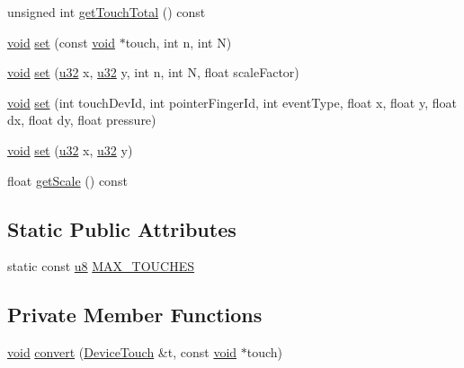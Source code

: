\begin{DoxyCompactItemize}
\item 
unsigned int \mbox{\hyperlink{classnjli_1_1_device_touch_a0e56cd03f8514af36b8d40151c913647}{get\+Touch\+Total}} () const
\item 
\mbox{\hyperlink{_thread_8h_af1e856da2e658414cb2456cb6f7ebc66}{void}} \mbox{\hyperlink{classnjli_1_1_device_touch_af37ae2aa3c4b1bb24a1f69e32a0cd659}{set}} (const \mbox{\hyperlink{_thread_8h_af1e856da2e658414cb2456cb6f7ebc66}{void}} $\ast$touch, int n, int N)
\item 
\mbox{\hyperlink{_thread_8h_af1e856da2e658414cb2456cb6f7ebc66}{void}} \mbox{\hyperlink{classnjli_1_1_device_touch_aab179cccc7d0c895455113d0706ae3b3}{set}} (\mbox{\hyperlink{_util_8h_a10e94b422ef0c20dcdec20d31a1f5049}{u32}} x, \mbox{\hyperlink{_util_8h_a10e94b422ef0c20dcdec20d31a1f5049}{u32}} y, int n, int N, float scale\+Factor)
\item 
\mbox{\hyperlink{_thread_8h_af1e856da2e658414cb2456cb6f7ebc66}{void}} \mbox{\hyperlink{classnjli_1_1_device_touch_a919bb88be34601d01c19c452bd3fae8b}{set}} (int touch\+Dev\+Id, int pointer\+Finger\+Id, int event\+Type, float x, float y, float dx, float dy, float pressure)
\item 
\mbox{\hyperlink{_thread_8h_af1e856da2e658414cb2456cb6f7ebc66}{void}} \mbox{\hyperlink{classnjli_1_1_device_touch_a82fca185d5e2b1378524b28db4fdd03e}{set}} (\mbox{\hyperlink{_util_8h_a10e94b422ef0c20dcdec20d31a1f5049}{u32}} x, \mbox{\hyperlink{_util_8h_a10e94b422ef0c20dcdec20d31a1f5049}{u32}} y)
\item 
float \mbox{\hyperlink{classnjli_1_1_device_touch_a9ae62b2e6e812acc5283a462788dbf81}{get\+Scale}} () const
\end{DoxyCompactItemize}
\subsection*{Static Public Attributes}
\begin{DoxyCompactItemize}
\item 
static const \mbox{\hyperlink{_util_8h_aed742c436da53c1080638ce6ef7d13de}{u8}} \mbox{\hyperlink{classnjli_1_1_device_touch_a8f2f389056e9750d3cee41875987c4fa}{M\+A\+X\+\_\+\+T\+O\+U\+C\+H\+ES}}
\end{DoxyCompactItemize}
\subsection*{Private Member Functions}
\begin{DoxyCompactItemize}
\item 
\mbox{\hyperlink{_thread_8h_af1e856da2e658414cb2456cb6f7ebc66}{void}} \mbox{\hyperlink{classnjli_1_1_device_touch_a2707fe5acb996fe22b1b20ceb6b1e063}{convert}} (\mbox{\hyperlink{classnjli_1_1_device_touch}{Device\+Touch}} \&t, const \mbox{\hyperlink{_thread_8h_af1e856da2e658414cb2456cb6f7ebc66}{void}} $\ast$touch)
\end{DoxyCompactItemize}

